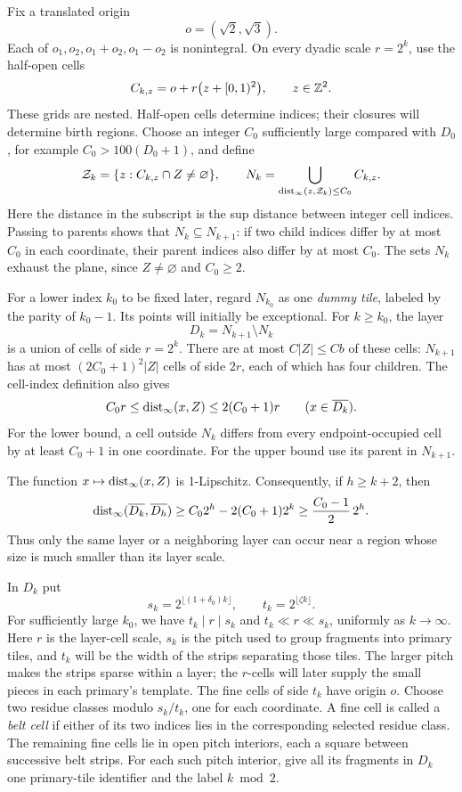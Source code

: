 Fix a translated origin
\[
 o=(\sqrt2,\sqrt3).
\]
Each of $o_1,o_2,o_1+o_2,o_1-o_2$ is nonintegral.  On every dyadic scale
$r=2^k$, use the half-open cells
\[
 C_{k,z}=o+r\bigl(z+[0,1)^2\bigr),\qquad z\in\mathbb Z^2.
\]
These grids are nested.  Half-open cells determine indices; their closures
will determine birth regions.  Choose an integer $C_0$ sufficiently large
compared with $D_0$, for example $C_0>100(D_0+1)$, and define
\[
 \mathcal Z_k=\{z:C_{k,z}\cap Z\ne\varnothing\},\qquad
 N_k=\bigcup_{\operatorname{dist}_\infty(z,\mathcal Z_k)\le C_0}C_{k,z}.
\]
Here the distance in the subscript is the sup distance between integer
cell indices.  Passing to parents shows that $N_k\subseteq N_{k+1}$:
if two child indices differ by at most $C_0$ in each coordinate, their
parent indices also differ by at most $C_0$.  The sets $N_k$ exhaust the
plane, since $Z\ne\varnothing$ and $C_0\ge2$.

For a lower index $k_0$ to be fixed later, regard $N_{k_0}$ as one
\emph{dummy tile}, labeled by the parity of $k_0-1$.  Its points will
initially be exceptional.  For $k\ge k_0$, the layer
\[
 D_k=N_{k+1}\setminus N_k
\]
is a union of cells of side $r=2^k$.  There are at most $C|Z|\le Cb$ of
these cells: $N_{k+1}$ has at most $(2C_0+1)^2|Z|$ cells of side $2r$,
each of which has four children.  The cell-index definition also gives
\begin{equation}
\label{geometry:layer-distance}
 C_0r\le\operatorname{dist}_\infty(x,Z)\le2(C_0+1)r
 \qquad(x\in\overline{D_k}).
\end{equation}
For the lower bound, a cell outside $N_k$ differs from every
endpoint-occupied cell by at least $C_0+1$ in one coordinate.  For the
upper bound use its parent in $N_{k+1}$.

The function $x\mapsto\operatorname{dist}_\infty(x,Z)$ is 1-Lipschitz.  Consequently,
if $h\ge k+2$, then
\begin{equation}
\label{geometry:nonadjacent}
 \operatorname{dist}_\infty(\overline{D_k},\overline{D_h})
 \ge C_0 2^h-2(C_0+1)2^k
 \ge \frac{C_0-1}{2}\,2^h.
\end{equation}
Thus only the same layer or a neighboring layer can occur near a region
whose size is much smaller than its layer scale.

In $D_k$ put
\[
 s_k=2^{\lfloor(1+\delta_0)k\rfloor},\qquad
 t_k=2^{\lfloor\zeta k\rfloor}.
\]
For sufficiently large $k_0$, we have $t_k\mid r\mid s_k$ and
$t_k\ll r\ll s_k$, uniformly as $k\to\infty$.  Here $r$ is the
layer-cell scale, $s_k$ is the pitch used to group fragments into primary
tiles, and $t_k$ will be the width of the strips separating those tiles.
The larger pitch makes the strips sparse within a layer; the $r$-cells
will later supply the small pieces in each primary's template.
The fine cells of side $t_k$ have origin $o$.  Choose two residue classes
modulo $s_k/t_k$, one for each coordinate.  A fine cell is called a \emph{belt cell} if either
of its two indices lies in the corresponding selected residue class.
The remaining fine cells lie in open pitch interiors, each a square
between successive belt strips.  For each such pitch interior, give all
its fragments in $D_k$ one primary-tile identifier and the label
$k\bmod2$.

